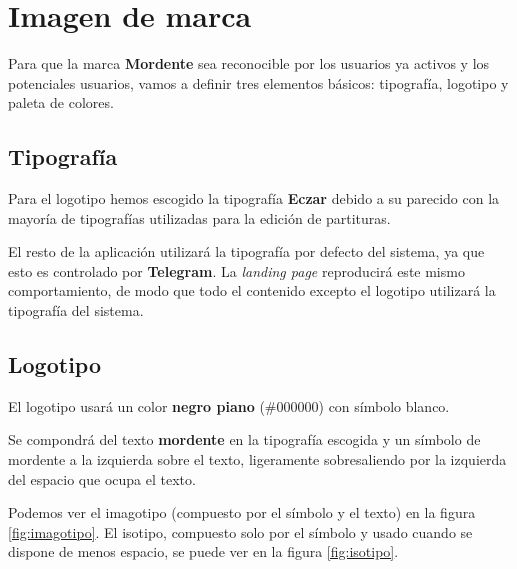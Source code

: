 \section{Imagen de marca}

Para que la marca \textbf{Mordente} sea reconocible por los usuarios ya activos y los potenciales usuarios, vamos a definir tres elementos básicos: tipografía, logotipo y paleta de colores.

\subsection{Tipografía}

Para el logotipo hemos escogido la tipografía \textbf{Eczar} debido a su parecido con la mayoría de tipografías utilizadas para la edición de partituras.

El resto de la aplicación utilizará la tipografía por defecto del sistema, ya que esto es controlado por \textbf{Telegram}. La \textit{landing page} reproducirá este mismo comportamiento, de modo que todo el contenido excepto el logotipo utilizará la tipografía del sistema.

\subsection{Logotipo}

El logotipo usará un color \textbf{negro piano} (\#000000) con símbolo blanco.

Se compondrá del texto \textbf{mordente} en la tipografía escogida y un símbolo de mordente a la izquierda sobre el texto, ligeramente sobresaliendo por la izquierda del espacio que ocupa el texto.

Podemos ver el imagotipo (compuesto por el símbolo y el texto) en la figura \ref{fig:imagotipo}. El isotipo, compuesto solo por el símbolo y usado cuando se dispone de menos espacio, se puede ver en la figura \ref{fig:isotipo}.

